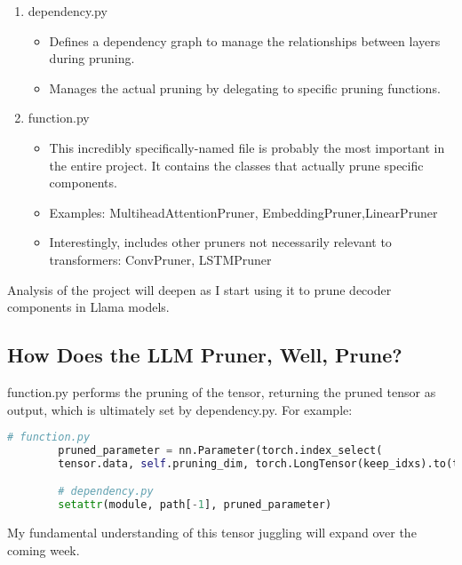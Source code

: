 \documentclass{article}
\begin{document}
\begin{enumerate}
\begin{itemize}
        \end{itemize}
        \item dependency.py
        \begin{itemize}
            \item Defines a dependency graph to manage the relationships between layers during pruning.
            \item Manages the actual pruning by delegating to specific pruning functions.
        \end{itemize}
        \item function.py
        \begin{itemize}
            \item This incredibly specifically-named file is probably the most important in the entire project.
            It contains the classes that actually prune specific components.
            \item Examples: MultiheadAttentionPruner, EmbeddingPruner,LinearPruner
            \item Interestingly, includes other pruners not necessarily relevant to transformers: ConvPruner, LSTMPruner
        \end{itemize}
    \end{enumerate}

    Analysis of the project will deepen as I start using it to prune decoder components in Llama models.

    \subsection{How Does the LLM Pruner, Well, Prune?}\label{subsec:how-prune}

    function.py performs the pruning of the tensor, returning the pruned tensor as output, which is ultimately set by dependency.py.
    For example:

    \begin{lstlisting}[language=Python,label={lst:lstlisting}]
        # function.py
        pruned_parameter = nn.Parameter(torch.index_select(
        tensor.data, self.pruning_dim, torch.LongTensor(keep_idxs).to(tensor.device)))

        # dependency.py
        setattr(module, path[-1], pruned_parameter)
    \end{lstlisting}

    My fundamental understanding of this tensor juggling will expand over the coming week.
\end{document}
